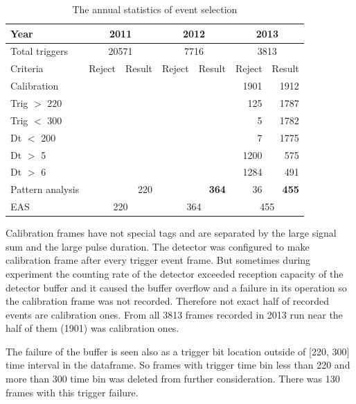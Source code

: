 \documentclass[final,5p,times,twocolumn]{elsarticle}
\begin{document}
\begin{table}[bth]
    \centering
    \caption{The annual statistics of event selection}
    \label{tab:rejection}
    \vspace{1pc}
    \begin{tabular}{|l||r|r||r|r||r|r|}
    \hline
    Year & \multicolumn{2}{|c||}{2011} & \multicolumn{2}{|c||}{2012} & \multicolumn{2}{|c|}{2013} \\
    \hline
    Total triggers & \multicolumn{2}{|c||}{20571} & \multicolumn{2}{|c||}{7716} & \multicolumn{2}{|c|}{3813}\\
    \hline
    \hline
    Criteria & Reject & Result & Reject & Result & Reject & Result\\ 
    \hline 
    Calibration   &&&& & 1901 & 1912\\
    Trig $>$ 220  &&&& &  125 & 1787\\
    Trig $<$ 300  &&&& &    5 & 1782\\
    Dt   $<$ 200  &&&& &    7 & 1775\\
    Dt   $>$  5   &&&& & 1200 &  575\\
    Dt   $>$  6   &&&& & 1284 &  491\\
    Pattern analysis & & 220 && {\bf 364} & 36 &  {\bf 455}\\
    \hline
    \hline
    EAS         & \multicolumn{2}{|c||}{220} & \multicolumn{2}{|c||}{364} & \multicolumn{2}{|c|}{455}\\
    \hline
    \end{tabular}
\end{table}


Calibration frames have not special tags and are separated by the large signal sum and the large pulse duration. The detector was configured to make calibration frame after every trigger event frame. But sometimes during experiment the counting rate of the detector exceeded reception capacity of the detector buffer and it caused the buffer overflow and a failure in its operation so the calibration frame was not recorded. Therefore not exact half of recorded events are calibration ones.
From all 3813 frames recorded in 2013 run near the half of them (1901) was calibration ones. 

The failure of the buffer is seen also as a trigger bit location outside of [220, 300] time interval in the dataframe. So frames with trigger time bin less than 220 and more than 300 time bin was deleted from further consideration. There was 130 frames with this trigger failure.
\end{document}

